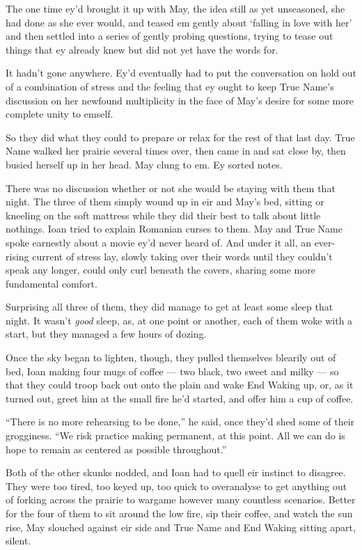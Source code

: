 The one time ey'd brought it up with May, the idea still as yet unseasoned, she had done as she ever would, and teased em gently about `falling in love with her' and then settled into a series of gently probing questions, trying to tease out things that ey already knew but did not yet have the words for.

It hadn't gone anywhere. Ey'd eventually had to put the conversation on hold out of a combination of stress and the feeling that ey ought to keep True Name's discussion on her newfound multiplicity in the face of May's desire for some more complete unity to emself.

So they did what they could to prepare or relax for the rest of that last day. True Name walked her prairie several times over, then came in and sat close by, then busied herself up in her head. May clung to em. Ey sorted notes.

There was no discussion whether or not she would be staying with them that night. The three of them simply wound up in eir and May's bed, sitting or kneeling on the soft mattress while they did their best to talk about little nothings. Ioan tried to explain Romanian curses to them. May and True Name spoke earnestly about a movie ey'd never heard of. And under it all, an ever-rising current of stress lay, slowly taking over their words until they couldn't speak any longer, could only curl beneath the covers, sharing some more fundamental comfort.

Surprising all three of them, they did manage to get at least some sleep that night. It wasn't \emph{good} sleep, as, at one point or another, each of them woke with a start, but they managed a few hours of dozing.

Once the sky began to lighten, though, they pulled themselves blearily out of bed, Ioan making four mugs of coffee — two black, two sweet and milky — so that they could troop back out onto the plain and wake End Waking up, or, as it turned out, greet him at the small fire he'd started, and offer him a cup of coffee.

``There is no more rehearsing to be done,'' he said, once they'd shed some of their grogginess. ``We risk practice making permanent, at this point. All we can do is hope to remain as centered as possible throughout.''

Both of the other skunks nodded, and Ioan had to quell eir instinct to disagree. They were too tired, too keyed up, too quick to overanalyse to get anything out of forking across the prairie to wargame however many countless scenarios. Better for the four of them to sit around the low fire, sip their coffee, and watch the sun rise, May slouched against eir side and True Name and End Waking sitting apart, silent.

